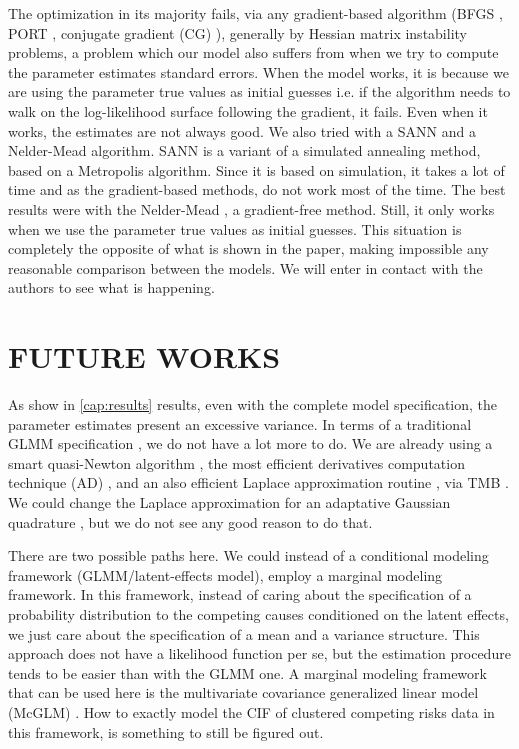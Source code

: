 The optimization in its majority fails, via any gradient-based algorithm
(BFGS \cite{nocedal&wright}, PORT \cite{PORTreport, PORTpaper},
conjugate gradient (CG) \cite{CG}), generally by Hessian matrix
instability problems, a problem which our model also suffers from when
we try to compute the parameter estimates standard errors. When the
model works, it is because we are using the parameter true values as
initial guesses i.e. if the algorithm needs to walk on the
log-likelihood surface following the gradient, it fails. Even when it
works, the estimates are not always good. We also tried with a SANN and
a Nelder-Mead algorithm. SANN \cite{SANN} is a variant of a simulated
annealing method, based on a Metropolis algorithm. Since it is based on
simulation, it takes a lot of time and as the gradient-based methods, do
not work most of the time. The best results were with the Nelder-Mead
\cite{neldermead}, a gradient-free method. Still, it only works when we
use the parameter true values as initial guesses. This situation is
completely the opposite of what is shown in the paper, making impossible
any reasonable comparison between the models. We will enter in contact
with the authors to see what is happening.

\section{FUTURE WORKS}
\label{cap:future}

As show in \autoref{cap:results} results, even with the complete model
specification, the parameter estimates present an excessive variance.
In terms of a traditional GLMM specification \cite{GLMM}, we do not have
a lot more to do. We are already using a smart quasi-Newton algorithm
\cite{PORTpaper}, the most efficient derivatives computation technique
(AD) \cite{peyre}, and an also efficient Laplace approximation routine
\cite{corestats, patrao}, via TMB \cite{TMB}. We could change the
Laplace approximation for an adaptative Gaussian quadrature
\cite{quadrature}, but we do not see any good reason to do that.

There are two possible paths here. We could instead of a conditional
modeling framework (GLMM/latent-effects model), employ a marginal
modeling framework. In this framework, instead of caring about the
specification of a probability distribution to the competing causes
conditioned on the latent effects, we just care about the specification
of a mean and a variance structure. This approach does not have a
likelihood function per se, but the estimation procedure tends to be
easier than with the GLMM one. A marginal modeling framework that can be
used here is the multivariate covariance generalized linear model
(McGLM) \cite{mcglm, rmcglm}. How to exactly model the CIF of clustered
competing risks data in this framework, is something to still be figured
out.

